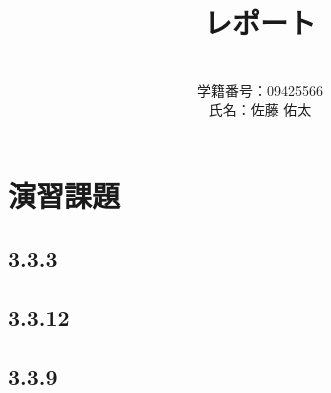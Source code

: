 \documentclass[a4j]{jarticle}
\title{レポート}
\author{\\学籍番号：09425566\\氏名：佐藤 佑太}
\begin{document}
\maketitle

\newpage


\section{演習課題}


\subsection{3.3.3}

%

\subsection{3.3.12}

%

\subsection{3.3.9}

%
\end{document}

